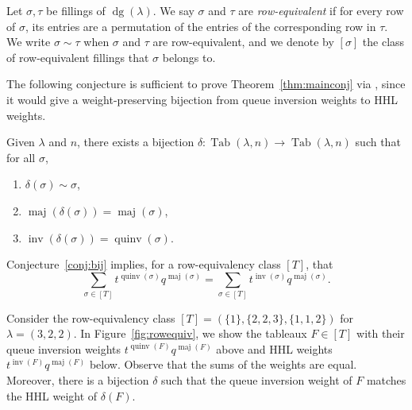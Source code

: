\documentclass[ALCO,Unicode]{cedram}
\DeclareMathOperator{\PQT}{Tab}
\DeclareMathOperator{\dg}{dg}
\DeclareMathOperator{\maj}{maj}
\DeclareMathOperator{\inv}{inv}
\DeclareMathOperator{\quinv}{quinv}
\begin{document}
\begin{defn}
Let $\sigma,\tau$ be fillings of $\dg(\lambda)$. We say $\sigma$ and $\tau$ are \emph{row-equivalent} if for every row of $\sigma$, its entries are a permutation of the entries of the corresponding row in $\tau$. We write $\sigma \sim \tau$ when $\sigma$ and $\tau$ are row-equivalent, and we denote by $[\sigma]$ the class of row-equivalent fillings that $\sigma$ belongs to. 
\end{defn}

The following conjecture is sufficient to prove Theorem~\ref{thm:mainconj} via \cite[Theorem 2.2]{HHL05}, since it would give a weight-preserving bijection from queue inversion weights to HHL weights.

\begin{conjecture}\label{conj:bij}
Given $\lambda$ and $n$, there exists a bijection $\delta:\PQT(\lambda,n) \rightarrow \PQT(\lambda,n)$ such that for all $\sigma$,
\begin{enumerate}[label=\roman*.]
\item $\delta(\sigma) \sim \sigma$,
\item $\maj(\delta(\sigma)) = \maj(\sigma)$,
\item $\inv(\delta(\sigma)) = \quinv(\sigma)$.
\end{enumerate} 
\end{conjecture}

Conjecture~\ref{conj:bij} implies, for a row-equivalency class $[T]$, that
\[
\sum_{\sigma\in[T]} t^{\quinv(\sigma)}q^{\maj(\sigma)} = \sum_{\sigma\in[T]} t^{\inv(\sigma)}q^{\maj(\sigma)}.
\]


\begin{example}
Consider the row-equivalency class $[T]=(\{1\},\{2,2,3\},\{1,1,2\})$ for $\lambda=(3,2,2)$. In Figure~\ref{fig:rowequiv}, we show the tableaux $F\in[T]$ with their queue inversion weights $t^{\quinv(F)}q^{\maj(F)}$ above and HHL weights $t^{\inv(F)}q^{\maj(F)}$ below. Observe that the sums of the weights are equal. Moreover, there is a bijection $\delta$  such that the queue inversion weight of $F$ matches the HHL weight of $\delta(F)$.
\end{example}
\end{document}
